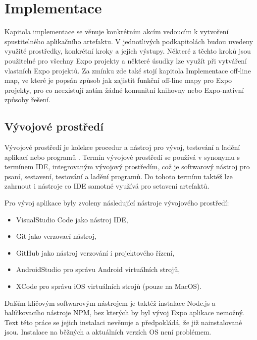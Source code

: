 
\chapter{Implementace}

Kapitola implementace se věnuje konkrétním akcím vedoucím k vytvoření spustitelného aplikačního artefaktu. V jednotlivých podkapitolách budou uvedeny využité prostředky, konkrétní kroky a jejich výstupy. Některé z těchto kroků jsou použitelné pro všechny Expo projekty a některé úsudky lze využít při vytváření vlastních Expo projektů. Za zmínku zde také stojí kapitola Implementace off-line map, ve které je popsán způsob jak zajistit funkční off-line mapy pro Expo projekty, pro co neexistují zatím žádné komunitní knihovny nebo Expo-nativní způsoby řešení.

\section{Vývojové prostředí}


Vývojové prostředí je kolekce procedur a nástroj pro vývoj, testování a ladění aplikací nebo programů \cite{technopediaDevEnv}. Termín vývojové prostředí se používá v synonymu s termínem IDE, integrovaným vývojový prostředím, což je softwarový nástroj pro psaní, sestavení, testování a ladění programů. Do tohoto termínu taktéž lze zahrnout i nástroje co IDE samotné využívá pro setavení artefaktů.

Pro vývoj aplikace byly zvoleny následující nástroje vývojového prostředí:

\begin{itemize}
	\item VisualStudio Code jako nástroj IDE,
	\item Git jako verzovací nástroj,
	\item GitHub jako nástroj verzování i projektového řízení,
	\item AndroidStudio pro správu Android virtuálních strojů,
	\item XCode pro správu iOS virtuálních strojů (pouze na MacOS).
\end{itemize}

Dalším klíčovým softwarovým nástrojem je taktéž instalace Node.js a balíčkovacího nástroje NPM, bez kterých by byl vývoj Expo aplikace nemožný. Text této práce se jejich instalaci nevěnuje a předpokládá, že již nainstalované jsou. Instalace na běžných a aktuálních verzích OS není problémem.

